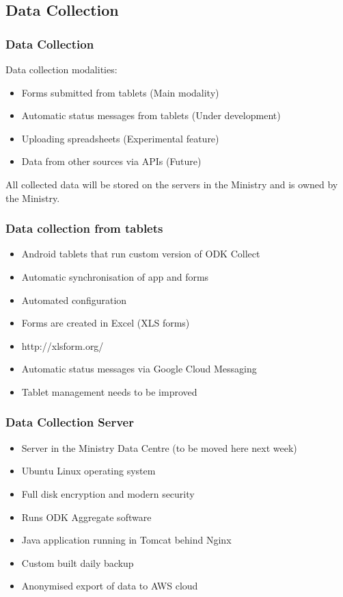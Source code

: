 \documentclass{beamer}
\begin{document}
\subsection{Data Collection}

\begin{frame}
  \frametitle{Data Collection}
  Data collection modalities:
  \begin{itemize}
  \item Forms submitted from tablets (Main modality)
  \item Automatic status messages from tablets (Under development)
  \item Uploading spreadsheets (Experimental feature)
  \item Data from other sources via APIs (Future)
  \end{itemize}

  \vspace{10pt}
  All collected data will be stored on the servers in the Ministry and is owned by the Ministry. 
\end{frame}


\begin{frame}
  \frametitle{Data collection from tablets}
  \begin{itemize}
  \item Android tablets that run custom version of ODK Collect
  \item Automatic synchronisation of app and forms
  \item Automated configuration
  \item Forms are created in Excel (XLS forms)
  \item http://xlsform.org/
  \item Automatic status messages via Google Cloud Messaging
  \item Tablet management needs to be improved
  \end{itemize}
\end{frame}
\begin{frame}
  \frametitle{Data Collection Server}
  \begin{itemize}
  \item Server in the Ministry Data Centre (to be moved here next week)
  \item Ubuntu Linux operating system
  \item Full disk encryption and modern security
  \item Runs ODK Aggregate software
  \item Java application running in Tomcat behind Nginx
  \item Custom built daily backup
  \item Anonymised export of data to AWS cloud
  \end{itemize}
\end{frame}
\end{document}
